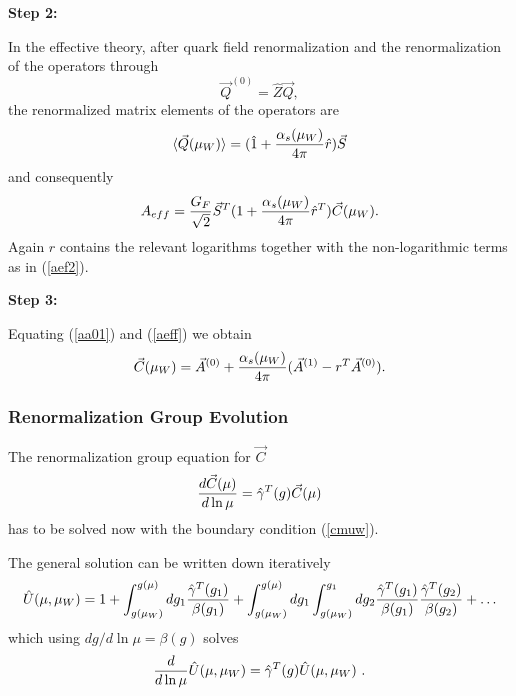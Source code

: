 \documentclass[12pt]{article}
\def\as{\alpha_s}
\begin{document}
\begin{itemize}
\begin{itemize}
\begin{itemize}
{\bf Step 2:}

In the effective theory,
after quark field renormalization and the
renormalization of the operators through
\begin{equation}\label{q0z3}
\vec Q^{(0)}=\hat Z\vec Q,  
\end{equation}
the renormalized matrix elements of the operators
are
\begin{equation}\label{qars}
\langle\vec Q(\mu_W)\rangle=(\hat 1
+{\as(\mu_W)\over 4\pi} \hat r)\vec S  \end{equation}
and consequently
\begin{equation}\label{aeff}  A_{eff}=
{G_F\over\sqrt{2}}\vec S^T(1+{\as(\mu_W)\over 4\pi} \hat r^T) 
\vec C(\mu_W).\end{equation}
Again $\hat r$ contains the relevant logarithms together with
the non-logarithmic terms as in (\ref{aef2}).

{\bf Step 3:}

Equating (\ref{aa01}) and (\ref{aeff}) we obtain
\begin{equation}\label{cmuw} 
\vec C(\mu_W)=
\vec A^{(0)}+{\as(\mu_W)\over 4\pi}
(\vec A^{(1)}-r^T\vec A^{(0)}).
\end{equation}

\subsubsection{Renormalization Group Evolution}
The renormalization group equation for $\vec C$
\begin{equation}\label{rgcv}
{d \vec C(\mu)\over d\ln\mu}=\hat\gamma^T(g)\vec C(\mu)   
\end{equation}
has to be solved now with the boundary condition (\ref{cmuw}). 

The general solution can be written down iteratively
\begin{equation}\label{uit}
\hat U(\mu,\mu_W)=1+\int^{g(\mu)}_{g(\mu_W)}
dg_1{\hat\gamma^T(g_1)\over\beta(g_1)}+
\int^{g(\mu)}_{g(\mu_W)}dg_1\int^{g_1}_{g(\mu_W)}dg_2
{\hat\gamma^T(g_1)\over\beta(g_1)}{\hat\gamma^T(g_2)\over\beta(g_2)}+\ldots 
\end{equation}
which using $dg/d\ln\mu=\beta(g)$  solves
\begin{equation}\label{rgu}
{d\over d\ln\mu}\hat U(\mu, \mu_W)=\hat\gamma^T(g)\hat U(\mu, \mu_W)~.
   \end{equation}


\end{itemize}
\end{itemize}
\end{itemize}
\end{document}
